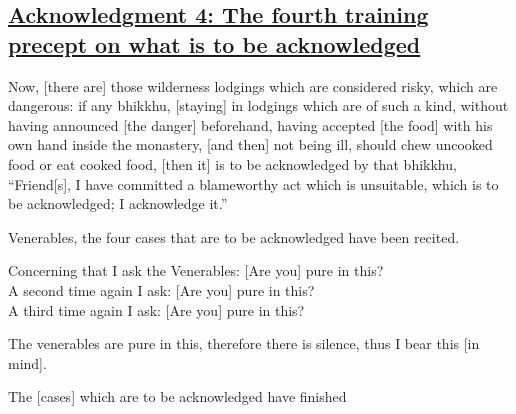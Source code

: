 \subsection*{\hyperref[pd4]{Acknowledgment 4: The fourth training precept on what is to be acknowledged}}
\label{ack4}
Now, [there are] those wilderness lodgings which are considered risky, which are dangerous: if any bhikkhu, [staying] in lodgings which are of such a kind, without having announced [the danger] beforehand, having accepted [the food] with his own hand inside the monastery, [and then] not being ill, should chew uncooked food or eat cooked food, [then it] is to be acknowledged by that bhikkhu, ``Friend[s], I have committed a blameworthy act which is unsuitable, which is to be acknowledged; I acknowledge it.''



\medskip

\begin{center}
	Venerables, the four cases that are to be acknowledged have been recited.

	\smallskip

	Concerning that I ask the Venerables: [Are you] pure in this?\\
	A second time again I ask: [Are you] pure in this?\\
	A third time again I ask: [Are you] pure in this?

	\smallskip

	The venerables are pure in this, therefore there is silence, thus I bear this [in mind].
\end{center}

\begin{outro}
	The [cases] which are to be acknowledged have finished
\end{outro}

\clearpage

